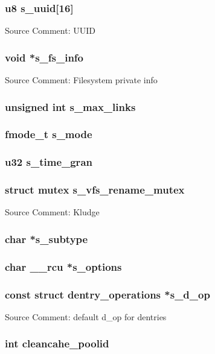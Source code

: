 \documentclass{article}
\newcommand{\sourcecomment}[2][]{Source Comment: #2 \newline #1}
\newcommand{\separator}[0]{\makebox[\textwidth]{\rule{\paperwidth}{0.4pt}}}
\begin{document}
\subsubsection{u8 s_uuid[16]}
\sourcecomment{UUID}

\separator{}

\subsubsection{void *s_fs_info}
\sourcecomment{Filesystem private info}
\subsubsection{unsigned int s_max_links}
\subsubsection{fmode_t s_mode}

\separator{}

\subsubsection{u32 s_time_gran}

\separator{}

\subsubsection{struct mutex s_vfs_rename_mutex}
\sourcecomment{Kludge}

\separator{}

\subsubsection{char *s_subtype}

\separator{}

\subsubsection{char __rcu *s_options}
\subsubsection{const struct dentry_operations *s_d_op}
\sourcecomment{default d_op for dentries}

\separator{}

\subsubsection{int cleancahe_poolid}
\end{document}
